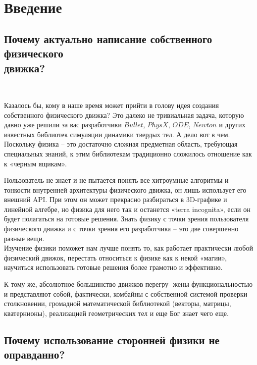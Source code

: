 \chapter*{Введение}

\section{Почему актуально написание собственного физического \\ движка?} 
\

Казалось бы, кому в наше время может прийти в голову
идея создания собственного физического движка? Это далеко не
тривиальная задача, которую давно уже решили за вас
разработчики $Bullet$, $PhysX$, $ODE$, $Newton$ и других известных
библиотек симуляции динамики твердых тел. А дело вот в чем.
\\

Поскольку физика – это достаточно сложная предметная
область, требующая специальных знаний, к этим библиотекам
традиционно сложилось отношение как к «черным ящикам».

Пользователь не знает и не пытается понять все хитроумные
алгоритмы и тонкости внутренней архитектуры физического
движка, он лишь использует его внешний API. При этом он
может прекрасно разбираться в 3D-графике и линейной
алгебре, но физика для него так и останется «terra incognita»,
если он будет полагаться на готовые решения.
Знать физику с точки зрения пользователя физического
движка и с точки зрения его разработчика – это две совершенно
разные вещи.
\\

Изучение физики поможет нам лучше понять то,
как работает практически любой физический движок, перестать
относиться к физике как к некой «магии», научиться
использовать готовые решения более грамотно и эффективно.

К тому же, абсолютное большинство движков перегру-
жены функциональностью и представляют собой, фактически,
комбайны с собственной системой проверки столкновении,
громадной математической библиотекой (векторы, матрицы,
кватернионы), реализацией геометрических тел и еще Бог знает
чего еще. 

\section{Почему использование сторонней физики не оправданно?} 
\

